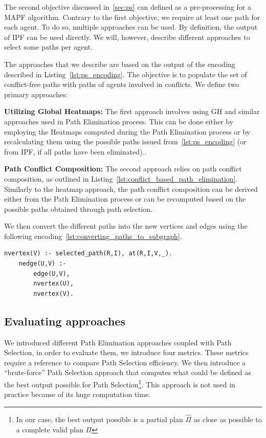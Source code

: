 The second objective discussed in~\ref{sec:ps} can defined as a pre-processing for a MAPF algorithm. Contrary to the first objective, we require at least one path for each agent. To do so, multiple approaches can be used. By definition, the output of IPF can be used directly. We will, however, describe different approaches to select some paths per agent. 

The approaches that we describe are based on the output of the encoding described in Listing~\ref{lst:ps_encoding}.
The objective is to populate the set of conflict-free paths with paths of agents involved in conflicts. We define two primary approaches:

\noindent\textbf{Utilizing Global Heatmaps:} The first approach involves using GH and similar approaches used in Path Elimination process. This can be done either by employing the Heatmaps computed during the Path Elimination process or by recalculating them using the possible paths issued from~\ref{lst:ps_encoding}  (or from IPF, if all paths have been eliminated)..

\noindent\textbf{Path Conflict Composition:} The second approach relies on path conflict composition, as outlined in Listing~\ref{lst:conflict_based_path_elimination}. Similarly to the heatmap approach, the path conflict composition can be derived either from the Path Elimination process or can be recomputed based on the possible paths obtained through path selection.


We then convert the different paths into the new vertices and edges using the following encoding~\ref{lst:converting_paths_to_subgraph}.

\begin{minipage}[H]{\linewidth}
\begin{lstlisting}[style=mystyle, caption={Converting path to subgraph}, label={lst:converting_paths_to_subgraph}]
    nvertex(V) :- selected_path(R,I), at(R,I,V,_).
    nedge(U,V) :- 
        edge(U,V), 
        nvertex(U), 
        nvertex(V).
\end{lstlisting}
\end{minipage}


\subsection{Evaluating approaches}

We introduced different Path Elimination approaches coupled with Path  Selection, in order to evaluate them, we introduce four metrics. These metrics require a reference to compare Path Selection efficiency. We then introduce a ``brute-force'' Path Selection approach that computes what could be defined as the best output possible for Path Selection\footnote{In our case, the best output possible is a partial plan \(\hat{\Pi}\) as close as possible to a complete valid plan \(\Pi\)}.  This approach is not used in practice because of its huge computation time.


